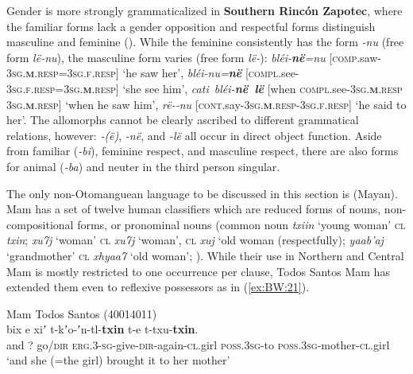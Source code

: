\documentclass[output=collectionpaper]{langsci/langscibook}
\begin{document}
Gender is more strongly grammaticalized in \textbf{Southern Rincón Zapotec}, where the familiar forms lack a gender opposition and respectful forms distinguish masculine and feminine (\citealt[363]{Earl2006}). While the feminine consistently has the form \textit{-nu} (free form \textit{lë-nu}), the masculine form varies (free form \textit{lë-\textquotesingle}): \textit{blé\textquotesingle i-\textbf{në\textquotesingle}=nu} [\textsc{comp}.saw-\textsc{3sg.\textbf{m}.resp=3sg.f.resp}] ‘he saw her’, \textit{blé\textquotesingle i-nu=\textbf{në\textquotesingle}} [\textsc{compl}.see-\textsc{3sg.f.resp=3sg.\textbf{m}.resp}] ‘she see him’, \textit{cati\textquotesingle\ blé\textquotesingle i-\textbf{në\textquotesingle\ lë\textquotesingle}} [when \textsc{compl}.see-\textsc{3sg.\textbf{m}.resp} \textsc{3sg.\textbf{m}.resp}] ‘when he saw him’, \textit{rë-\textbf{\textquotesingle}‑nu} [\textsc{cont}.say-\textsc{3sg.\textbf{m}.resp-3sg.f.resp}] ‘he said to her’. The allomorphs cannot be clearly ascribed to different grammatical relations, however: \textit{-(ë)\textquotesingle},  \textit{-në\textquotesingle}, and \textit{-lë\textquotesingle} all occur in direct object function. Aside from familiar (\textit{-bi\textquotesingle}), feminine respect, and masculine respect, there are also forms for animal (\textit{-ba}) and neuter in the third person singular.

The only non-Otomanguean language to be discussed in this section is  (Mayan). Mam has a set of twelve human classifiers which are reduced forms of nouns, non-compositional forms, or pronominal nouns (common noun \textit{txiin} ‘young woman’ \textsc{cl} \textit{txin}; \textit{xu7j} ‘woman’ \textsc{cl} \textit{xu7j} ‘woman’, \textsc{cl} \textit{xuj} ‘old woman (respectfully); \textit{yaab’aj} ‘grandmother’ \textsc{cl} \textit{xhyaa7} ‘old woman’; \citealt[158]{England1983}). While their use in Northern and Central Mam is mostly restricted to one occurrence per clause, Todos Santos Mam has extended them even to reflexive possessors as in (\ref{ex:BW:21}).

\ea\label{ex:BW:21}
Mam Todos Santos (40014011)\\
\gll [...]	bix	e	xiʼ	t-kʼo-ʼn-tl-\textbf{txin}	t-e	t-txu-\textbf{txin}.	\\
{} 	and	?	go/\textsc{dir}	\textsc{erg.3-sg}-give-\textsc{dir}-again-\textsc{cl}.girl	\textsc{poss.3sg}-to	\textsc{poss.3sg}-mother-\textsc{cl}.girl\\
\glt ‘and she (=the girl) brought it to her mother’\\
\z
\end{document}
